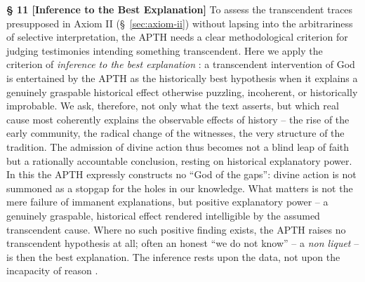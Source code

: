 \documentclass[11pt,a4paper]{article}
\makeatletter
\newcommand{\apth}{{\apthfont APTH}\hspace{0.15em}\xspace}
\newcommand{\apthsec}[3]{%
  \phantomsection%
  \def\@currentlabel{#1}%
  \label{sec:#3}%
  \textbf{§ #1 [#2]}%
}
\makeatother
\begin{document}
\apthsec{11}{Inference to the Best Explanation}{inferenz} To assess the transcendent traces presupposed in Axiom II (§~\ref{sec:axiom-ii}) without lapsing into the arbitrariness of selective interpretation, the \apth needs a clear methodological criterion for judging testimonies intending something transcendent. Here we apply the criterion of \textit{inference to the best explanation} \citep{harman1965,lipton2004,wright1992}: a transcendent intervention of God is entertained by the \apth as the historically best hypothesis when it explains a genuinely graspable historical effect otherwise puzzling, incoherent, or historically improbable. We ask, therefore, not only what the text asserts, but which real cause most coherently explains the observable effects of history -- the rise of the early community, the radical change of the witnesses, the very structure of the tradition. The admission of divine action thus becomes not a blind leap of faith but a rationally accountable conclusion, resting on historical explanatory power. In this the \apth expressly constructs no ``God of the gaps'': divine action is not summoned as a stopgap for the holes in our knowledge. What matters is not the mere failure of immanent explanations, but positive explanatory power -- a genuinely graspable, historical effect rendered intelligible by the assumed transcendent cause. Where no such positive finding exists, the \apth raises no transcendent hypothesis at all; often an honest ``we do not know'' -- a \textit{non liquet} -- is then the best explanation. The inference rests upon the data, not upon the incapacity of reason \citep{bonhoeffer1951,coulson1955,plantinga2011}.
\end{document}

